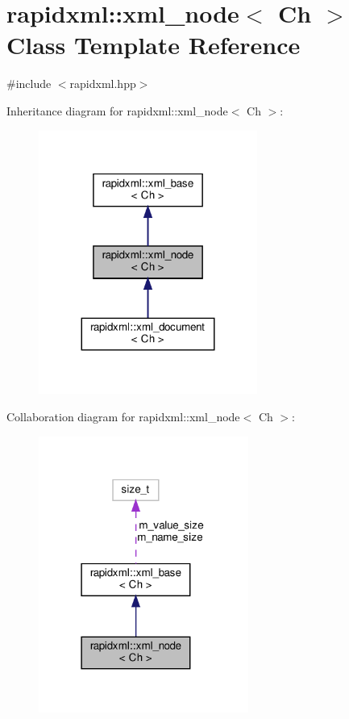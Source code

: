 \hypertarget{classrapidxml_1_1xml__node}{}\section{rapidxml\+:\+:xml\+\_\+node$<$ Ch $>$ Class Template Reference}
\label{classrapidxml_1_1xml__node}


{\ttfamily \#include $<$rapidxml.\+hpp$>$}



Inheritance diagram for rapidxml\+:\+:xml\+\_\+node$<$ Ch $>$\+:
\nopagebreak
\begin{figure}[H]
\begin{center}
\leavevmode
\includegraphics[width=203pt]{classrapidxml_1_1xml__node__inherit__graph}
\end{center}
\end{figure}


Collaboration diagram for rapidxml\+:\+:xml\+\_\+node$<$ Ch $>$\+:
\nopagebreak
\begin{figure}[H]
\begin{center}
\leavevmode
\includegraphics[width=195pt]{classrapidxml_1_1xml__node__coll__graph}
\end{center}
\end{figure}
